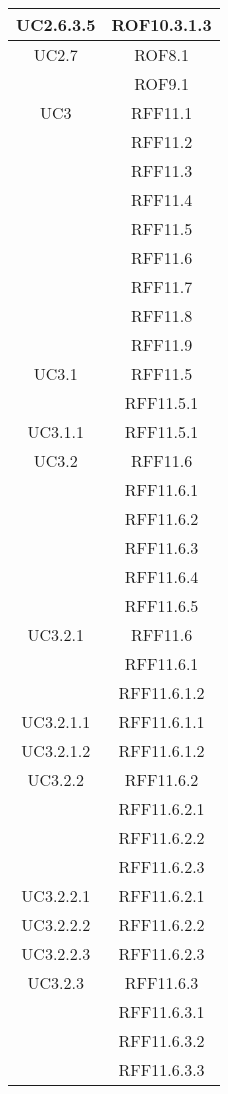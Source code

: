\begin{longtable}{|c|c|}
\midrule
UC2.6.3.5
& ROF10.3.1.3\\

\midrule
UC2.7
& ROF8.1\\
& ROF9.1\\


\midrule
UC3
& RFF11.1\\
& RFF11.2\\
& RFF11.3\\
& RFF11.4\\
& RFF11.5\\
& RFF11.6\\
& RFF11.7\\
& RFF11.8\\
& RFF11.9\\

\midrule
UC3.1
& RFF11.5\\
& RFF11.5.1\\


\midrule
UC3.1.1
& RFF11.5.1\\

\midrule
UC3.2
& RFF11.6\\
& RFF11.6.1\\
& RFF11.6.2\\
& RFF11.6.3\\
& RFF11.6.4\\
& RFF11.6.5\\

\midrule
UC3.2.1
& RFF11.6\\
& RFF11.6.1\\
& RFF11.6.1.2\\

\midrule
UC3.2.1.1
& RFF11.6.1.1\\

\midrule
UC3.2.1.2
& RFF11.6.1.2\\

\midrule
UC3.2.2
& RFF11.6.2\\
& RFF11.6.2.1\\
& RFF11.6.2.2\\
& RFF11.6.2.3\\

\midrule
UC3.2.2.1
& RFF11.6.2.1\\

\midrule
UC3.2.2.2
& RFF11.6.2.2\\

\midrule
UC3.2.2.3
& RFF11.6.2.3\\

\midrule
UC3.2.3
& RFF11.6.3\\
& RFF11.6.3.1\\
& RFF11.6.3.2\\
& RFF11.6.3.3\\


\end{longtable}
